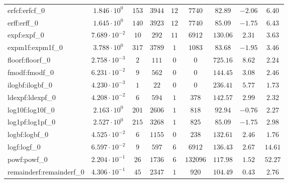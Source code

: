 \begin{tabular}{|l|c|c|c|c|c|c|c|c|}
erfcf:erfcf\_0               & $ 1.846 \cdot 10^{0}  $ & $ 153    $ & $ 3944  $ & $ 12  $ & $ 7740   $ & $ 82.89       $ & $ -2.06   $ & $ 6.40    $ \\
erff:erff\_0                 & $ 1.645 \cdot 10^{0}  $ & $ 140    $ & $ 3923  $ & $ 12  $ & $ 7740   $ & $ 85.09       $ & $ -1.75   $ & $ 6.43    $ \\
expf:expf\_0                 & $ 7.689 \cdot 10^{-2} $ & $ 10     $ & $ 292   $ & $ 11  $ & $ 6912   $ & $ 130.06      $ & $ 2.31    $ & $ 3.63    $ \\
expm1f:expm1f\_0             & $ 3.788 \cdot 10^{0}  $ & $ 317    $ & $ 3789  $ & $ 1   $ & $ 1083   $ & $ 83.68       $ & $ -1.95   $ & $ 3.46    $ \\
floorf:floorf\_0             & $ 2.758 \cdot 10^{-3} $ & $ 2      $ & $ 111   $ & $ 0   $ & $ 0      $ & $ 725.16      $ & $ 8.62    $ & $ 2.24    $ \\
fmodf:fmodf\_0               & $ 6.231 \cdot 10^{-2} $ & $ 9      $ & $ 562   $ & $ 0   $ & $ 0      $ & $ 144.45      $ & $ 3.08    $ & $ 2.46    $ \\
ilogbf:ilogbf\_0             & $ 4.230 \cdot 10^{-3} $ & $ 1      $ & $ 22    $ & $ 0   $ & $ 0      $ & $ 236.41      $ & $ 5.77    $ & $ 1.73    $ \\
ldexpf:ldexpf\_0             & $ 4.208 \cdot 10^{-2} $ & $ 6      $ & $ 594   $ & $ 1   $ & $ 378    $ & $ 142.57      $ & $ 2.99    $ & $ 2.32    $ \\
log10f:log10f\_0             & $ 2.163 \cdot 10^{0}  $ & $ 201    $ & $ 2606  $ & $ 1   $ & $ 818    $ & $ 92.94       $ & $ -0.76   $ & $ 2.27    $ \\
log1pf:log1pf\_0             & $ 2.527 \cdot 10^{0}  $ & $ 215    $ & $ 3268  $ & $ 1   $ & $ 825    $ & $ 85.09       $ & $ -1.75   $ & $ 2.98    $ \\
logbf:logbf\_0               & $ 4.525 \cdot 10^{-2} $ & $ 6      $ & $ 1155  $ & $ 0   $ & $ 238    $ & $ 132.61      $ & $ 2.46    $ & $ 1.76    $ \\
logf:logf\_0                 & $ 6.597 \cdot 10^{-2} $ & $ 9      $ & $ 597   $ & $ 6   $ & $ 6912   $ & $ 136.43      $ & $ 2.67    $ & $ 14.61   $ \\
powf:powf\_0                 & $ 2.204 \cdot 10^{-1} $ & $ 26     $ & $ 1736  $ & $ 6   $ & $ 132096 $ & $ 117.98      $ & $ 1.52    $ & $ 52.27   $ \\
remainderf:remainderf\_0     & $ 4.306 \cdot 10^{-1} $ & $ 45     $ & $ 2347  $ & $ 1   $ & $ 920    $ & $ 104.49      $ & $ 0.43    $ & $ 2.76    $ \\

\end{tabular}
